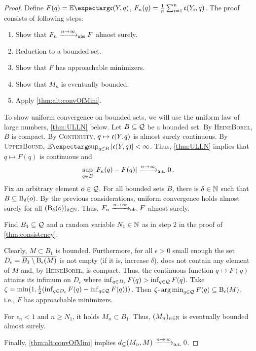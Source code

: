 \begin{proof}
Define $F(q) = \Ex{\mf c(Y, q)}$, $F_n(q) = \frac1n\sum_{i=1}^n \mathfrak{c}(Y_i, q)$.  The proof consists of following steps:
\begin{enumerate}
\item Show that $F_n \xrightarrow{n\to\infty}_{\mathsf{ubs}} F$ almost surely.
\item Reduction to a bounded set.
\item Show that $F$ has approachable minimizers.
\item Show that $M_n$ is eventually bounded.
\item Apply \autoref{thm:alt:convOfMini}.
\end{enumerate}
%
\underline{}
To show uniform convergence on bounded sets, we will use the uniform law of large numbers, \autoref{thm:ULLN} below.
Let $B\subseteq\mathcal{Q}$ be a bounded set.
By \textsc{HeineBorel}, $\overline{B}$ is compact.
By \textsc{Continuity}, $q \mapsto \mathfrak{c}(Y, q)$ is almost surely continuous.
By \textsc{UpperBound}, $\Ex{ \sup_{q\in B}\abs{\mf c(Y, q)}} < \infty$. Thus, \autoref{thm:ULLN} implies that $q \mapsto F(q)$ is continuous and
\begin{equation*}
	\sup_{q\in B}  \left| F_n(q)-F(q) \right| \xrightarrow{n\to\infty}_{\mathsf{a.s.}}0
	\, .
\end{equation*}
Fix an arbitrary element $o\in\mathcal{Q}$. For all bounded sets $B$, there is $\delta \in\mathbb{N}$ such that $B \subseteq \operatorname{\mathrm{B}}_\delta(o)$. By the previous considerations, uniform convergence holds almost surely for all $(\operatorname{\mathrm{B}}_{\delta}(o))_{\delta\in\mathbb{N}}$.
Thus, $F_n \xrightarrow{n\to\infty}_{\mathsf{ubs}} F$ almost surely.

%
\noindent
\underline{}
Find $B_1\subseteq\mathcal{Q}$ and a random variable $N_1\in\mathbb{N}$ as in step 2 in the proof of \autoref{thm:consistency}.

%
\noindent
\underline{}
Clearly, $M \subset B_1$ is bounded. Furthermore, for all $\epsilon > 0$ small enough the set $D_\epsilon = \overline{B_1 \setminus \operatorname{\mathrm{B}}_\epsilon(M)}$ is not empty (if it is, increase $\delta$), does not contain any element of $M$ and, by \textsc{HeineBorel}, is compact. Thus, the continuous function $q\mapsto F(q)$ attains its infimum on $D_\epsilon$ where $\inf_{q\in D_\epsilon} F(q) > \inf_{q\in \mathcal{Q}} F(q)$. Take $\zeta = \min(1, \frac12(\inf_{q\in D_\epsilon} F(q) - \inf_{q\in \mathcal{Q}} F(q)))$. Then $\zeta\text{-}\operatorname*{arg\,min}_{q\in\mathcal{Q}} F(q) \subseteq \operatorname{\mathrm{B}}_\epsilon(M)$, i.e., $F$ has approachable minimizers. 

%
\noindent
\underline{}
For $\epsilon_n < 1$ and $n \geq N_1$, it holds $M_n \subset B_1$. Thus, $(M_n)_{n\in\mathbb{N}}$ is eventually bounded almost surely.

%
\noindent
\underline{}
Finally, \autoref{thm:alt:convOfMini} implies $d_\subseteq(M_n, M) \xrightarrow{n\to\infty}_{\mathsf{a.s.}} 0$.
\end{proof}
%